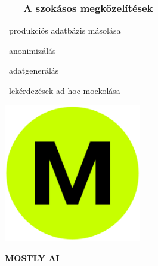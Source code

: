 \documentclass[
    aspectratio=169,
]{beamer}
\newcommand{\slidetitle}[2]{\frametitle{{\small #1 ~ \ding{226} ~ } \normalsize \textbf{#2} }}
\begin{document}
\begin{frame}[fragile]
    \slidetitle{\sectionshorttitle}{A szokásos megközelítések}
    
    \begin{minipage}[c]{0.58\textwidth}
        \begin{logolist}
            \setlength\itemsep{2em}
            \Large
            \item[\raisebox{-0.4em}{}]
                    ~produkciós adatbázis másolása
            \item[\raisebox{-0.4em}{}]
                    ~anonimizálás
            \item[\raisebox{-0.4em}{}]
                    ~adatgenerálás
            \item[\raisebox{-0.4em}{}]
                    ~lekérdezések ad hoc mockolása
        \end{logolist}
        \pause
    \end{minipage}%
    \hspace*{\fill}%
    \begin{minipage}[c]{0.35\textwidth}
        \centering
        
        \begin{minipage}[t]{0.48\textwidth}
            \centering
            
            \includegraphics[width=0.45\textwidth, frame]{image/mostly-ai}\par
            \textbf{MOSTLY AI}
            
            \vspace{5pt}
            

\end{minipage}
\end{minipage}
\end{frame}
\end{document}
